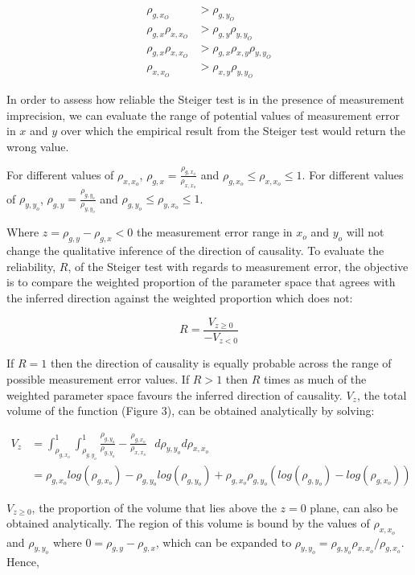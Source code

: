 \documentclass[]{article}
\begin{document}
\[
\begin{aligned}
\rho_{g, x_O} & > \rho_{g, y_O} \\
\rho_{g, x} \rho_{x, x_O} & > \rho_{g,y}\rho_{y,y_O}\\
\rho_{g, x} \rho_{x, x_O} & > \rho_{g,x}\rho_{x,y}\rho_{y,y_O}\\
\rho_{x, x_O} & > \rho_{x,y}\rho_{y,y_O}
\end{aligned}
\]

In order to assess how reliable the Steiger test is in the presence of
measurement imprecision, we can evaluate the range of potential values
of measurement error in \(x\) and \(y\) over which the empirical result
from the Steiger test would return the wrong value.

For different values of \(\rho_{x,x_o}\),
\(\rho_{g,x} = \frac{\rho_{g, x_o}}{\rho_{x,x_o}}\) and
\(\rho_{g,x_o} \leq \rho_{x,x_o} \leq 1\). For different values of
\(\rho_{y,y_o}\), \(\rho_{g,y} = \frac{\rho_{g, y_o}}{\rho_{y,y_o}}\)
and \(\rho_{g,y_o} \leq \rho_{y,x_o} \leq 1\).

Where \(z = \rho_{g,y} - \rho_{g,x} < 0\) the measurement error range in
\(x_o\) and \(y_o\) will not change the qualitative inference of the
direction of causality. To evaluate the reliability, \(R\), of the
Steiger test with regards to measurement error, the objective is to
compare the weighted proportion of the parameter space that agrees with
the inferred direction against the weighted proportion which does not:

\[
R = \frac{V_{z \geq 0}}{ - V_{z < 0} }
\]

If \(R=1\) then the direction of causality is equally probable across
the range of possible measurement error values. If \(R > 1\) then \(R\)
times as much of the weighted parameter space favours the inferred
direction of causality. \(V_{z}\), the total volume of the function
(Figure 3), can be obtained analytically by solving:

\[
\begin{aligned}
V_z & = \int^1_{\rho_{g,x_o}} \int^1_{\rho_{g,y_o}} \frac{\rho_{g,y_o}}{\rho_{y,y_o}} - \frac{\rho_{g,x_o}}{\rho_{x,x_o}}\,\,\,\, d\rho_{y,y_o}d\rho_{x,x_o} \\
& = \rho_{g,x_o}log(\rho_{g,x_o}) - \rho_{g,y_o}log(\rho_{g,y_o}) + \rho_{g,x_o}\rho_{g,y_o}(log(\rho_{g,y_o})-log(\rho_{g,x_o}))
\end{aligned}
\]

\(V_{z \ge 0}\), the proportion of the volume that lies above the
\(z=0\) plane, can also be obtained analytically. The region of this
volume is bound by the values of \(\rho_{x,x_o}\) and \(\rho_{y,y_o}\)
where \(0 = \rho_{g,y} - \rho_{g,x}\), which can be expanded to
\(\rho_{y,y_o} = \rho_{g,y_o}\rho_{x,x_o} / \rho_{g,x_o}\). Hence,
\end{document}
